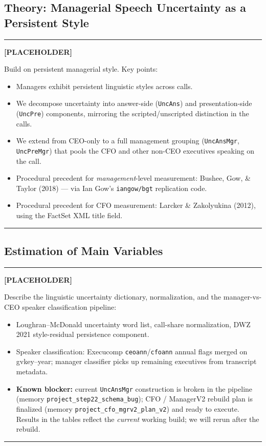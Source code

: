 \documentclass[11pt,a4paper,twocolumn]{article}
\newenvironment{placeholder}{%
  \par\medskip\noindent%
  {\color{placeholderaccent}\rule{\linewidth}{0.4pt}}\par%
  \noindent\textbf{\color{placeholderaccent}[PLACEHOLDER]}\par%
  \smallskip\itshape%
}{%
  \par\upshape\smallskip%
  {\color{placeholderaccent}\rule{\linewidth}{0.4pt}}\par\medskip%
}
\begin{document}
\subsection{Theory: Managerial Speech Uncertainty as a Persistent Style}
\label{sec:framework_theory}
\begin{placeholder}
Build on \citet{DWZ2021} persistent managerial style. Key points:
\begin{itemize}
  \item Managers exhibit persistent linguistic styles across calls.
  \item We decompose uncertainty into answer-side (\texttt{UncAns})
        and presentation-side (\texttt{UncPre}) components, mirroring
        the scripted/unscripted distinction in the calls.
  \item We extend from CEO-only to a full management grouping
        (\texttt{UncAnsMgr}, \texttt{UncPreMgr}) that pools the CFO and
        other non-CEO executives speaking on the call.
  \item Procedural precedent for \emph{management}-level measurement:
        Bushee, Gow, \& Taylor (2018) --- via Ian Gow's
        \texttt{iangow/bgt} replication code.
  \item Procedural precedent for CFO measurement: Larcker \& Zakolyukina
        (2012), using the FactSet XML title field.
\end{itemize}
\end{placeholder}

\subsection{Estimation of Main Variables}
\label{sec:framework_estimation}
\begin{placeholder}
Describe the linguistic uncertainty dictionary, normalization, and the
manager-vs-CEO speaker classification pipeline:
\begin{itemize}
  \item Loughran--McDonald uncertainty word list, call-share
        normalization, DWZ 2021 style-residual persistence component.
  \item Speaker classification: Execucomp \texttt{ceoann}/\texttt{cfoann}
        annual flags merged on gvkey--year; manager classifier picks up
        remaining executives from transcript metadata.
  \item \textbf{Known blocker:} current \texttt{UncAnsMgr} construction
        is broken in the pipeline (memory
        \texttt{project\_step22\_schema\_bug}); CFO / ManagerV2 rebuild
        plan is finalized (memory \texttt{project\_cfo\_mgrv2\_plan\_v2})
        and ready to execute. Results in the tables reflect the
        \emph{current} working build; we will rerun after the rebuild.
\end{itemize}
\end{placeholder}
\end{document}
